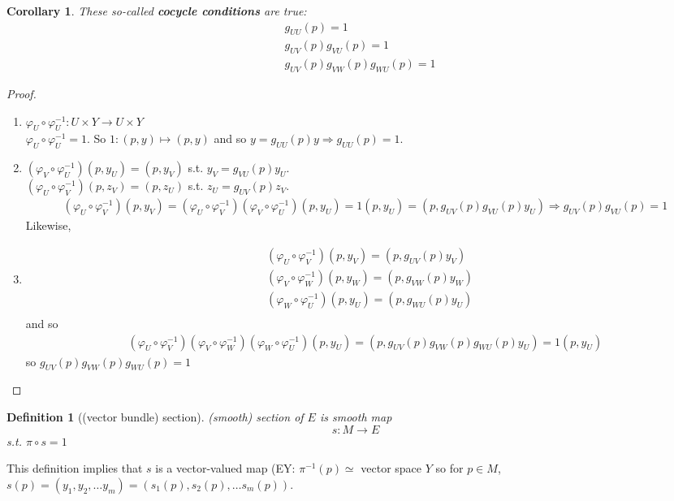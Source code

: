 \documentclass[10pt]{amsart}
\newtheorem{corollary}{Corollary}
\newtheorem{definition}{Definition}
\begin{document}
\begin{multicols*}{2}
\begin{corollary}
These so-called \textbf{cocycle conditions} are true:
\begin{equation}
\begin{aligned}
& g_{UU}(p) = 1 \\
& g_{UV}(p) g_{VU}(p) = 1 \\
& g_{UV}(p) g_{VW}(p) g_{WU}(p) = 1
\end{aligned}
\end{equation}
\end{corollary}

\begin{proof}
\begin{enumerate}
\item $\varphi_U \circ \varphi_U^{-1}: U\times Y \to U\times Y$ \\
$\varphi_U \circ \varphi_U^{-1} =1$. So $1:(p,y) \mapsto (p, y)$ and so $y = g_{UU}(p) y \Longrightarrow g_{UU}(p) = 1$.
\item $(\varphi_V \circ \varphi_U^{-1}) (p,y_U) = (p, y_V) $ s.t. $y_V = g_{VU}(p) y_U$. \\

$(\varphi_U \circ \varphi_V^{-1}) (p,z_V) = (p, z_U) $ s.t. $z_U = g_{UV}(p) z_V$. \\
\[
\begin{gathered}
(\varphi_U\circ \varphi_V^{-1}) (p, y_V) = (\varphi_U\circ \varphi_V^{-1}) (\varphi_V\circ \varphi_U^{-1}) (p, y_U) = 1 (p, y_U) = (p, g_{UV}(p) g_{VU}(p) y_U) \Longrightarrow g_{UV}(p) g_{VU}(p) = 1
\end{gathered}
\] Likewise,
\item \[
\begin{aligned}
& (\varphi_U \circ \varphi_V^{-1}) (p, y_V) = (p, g_{UV}(p) y_V) \\
& (\varphi_V \circ \varphi_W^{-1}) (p, y_W) = (p, g_{VW}(p) y_W) \\
& (\varphi_W \circ \varphi_U^{-1}) (p, y_U) = (p, g_{WU}(p) y_U) \\
\end{aligned}
\] and so
\[
\begin{gathered}
(\varphi_U \circ \varphi_V^{-1}) (\varphi_V \circ \varphi_W^{-1})(\varphi_W \circ \varphi_U^{-1}) (p, y_U) = (p, g_{UV}(p)g_{VW}(p)g_{WU}(p)y_U) = 1 (p, y_U)
\end{gathered}
\]
so $g_{UV}(p)g_{VW}(p)g_{WU}(p) = 1$
\end{enumerate}
\end{proof}

\begin{definition}[(vector bundle) section]
(smooth) section of $E$ is smooth map 
\begin{equation}
s : M \to E
\end{equation}
s.t. $\pi \circ s=1$
\end{definition}
This definition implies that $s$ is a vector-valued map (EY: $\pi^{-1}(p) \simeq $ vector space $Y$ so for $p \in M$, $s(p) = (y_1, y_2, \dots y_m) = (s_1(p), s_2(p), \dots s_m(p))$.


\end{multicols*}
\end{document}
